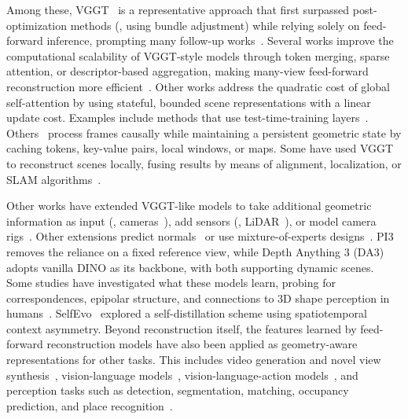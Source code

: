 Among these, VGGT~\cite{wang25vggt} is a representative approach that first surpassed post-optimization methods (\eg, using bundle adjustment) while relying solely on feed-forward inference, prompting many follow-up works~\cite{wang25p3, keetha26mapanything:, xiao25spatialtrackerv2:, chen25ttt3r:, deng25vggt-long:, lan26stream3r:, maggio25vggt-slam:, li25wint3r:, huang25longsplat:, szymanowicz26lagernvs, yuan25test3r:, deng26sail-recon:, jiang25anysplat:, cabon25must3r:, liu25plana3r:, li25rig3r:, zang26robust, chen26hd-vggt:, liu26streamcachevggt:, zhuo26streaming, jung26more:, mahdi25evict3r:, wang26lidar-vggt:, qi25fupad:, mazur264d-primitive-mache:}.
Several works improve the computational scalability of VGGT-style models through token merging, sparse attention, or descriptor-based aggregation, making many-view feed-forward reconstruction more efficient~\cite{shen26fastvggt:, wang25faster, mahdi25evict3r:}.
Other works address the quadratic cost of global self-attention by using stateful, bounded scene representations with a linear update cost.
Examples include methods that use test-time-training layers~\cite{chen26ttt3r:, jin26zipmap:, zhang26loger:}.
Others~\cite{zhuo26streaming, lan26stream3r:, chen26geometric, taher25kv-tracker:} process frames causally while maintaining a persistent geometric state by caching tokens, key-value pairs, local windows, or maps.
Some have used VGGT to reconstruct scenes locally, fusing results by means of alignment, localization, or SLAM algorithms~\cite{deng25vggt-long:, maggio25vggt-slam:, deng26sail-recon:, wang25amb3r:}.

Other works have extended VGGT-like models to take additional geometric information as input (\eg, cameras~\cite{keetha26mapanything:}), add sensors (\eg, LiDAR~\cite{wang26lidar-vggt:}), or model camera rigs~\cite{li25rig3r:}.
Other extensions predict normals~\cite{fang26dens3r:} or use mixture-of-experts designs~\cite{gao25more:, wang26moe3d:}.
PI3~\cite{wang25p3} removes the reliance on a fixed reference view, while Depth Anything 3 (DA3)~\cite{lin25depth} adopts vanilla DINO as its backbone, with both supporting dynamic scenes.
Some studies have investigated what these models learn, probing for correspondences, epipolar structure, and connections to 3D shape perception in humans~\cite{bratulic25on-geometric, bonnen26human-level}.
SelfEvo~\cite{huang26self-improving} explored a self-distillation scheme using spatiotemporal context asymmetry. 
Beyond reconstruction itself, the features learned by feed-forward reconstruction models have also been applied as geometry-aware representations for other tasks.
This includes video generation and novel view synthesis~\cite{jiang25anysplat:, huang26gen3r:, jang26repurposing, liu26camgeo:, szymanowicz26lagernvs}, vision-language models~\cite{zeng25janusvln:, qian26xembodied:, zhang26spatialstack:, zhang26make, zheng25learning, wang26let-geometry, yang26cambrian-s:, zhao25spacemind:, wu26mvggt:, lee253d-aware}, vision-language-action models~\cite{li25spatial, abouzeid25geoaware-vla:, vuong25improving, rao26augvla-3d:}, and perception tasks such as detection, segmentation, matching, occupancy prediction, and place recognition~\cite{cao26vggt-det:, gao26vggt-segmentor:, yang25dense, zhou26generalizing, xu26vggt-mpr:, deng25unipr-3d:}.

